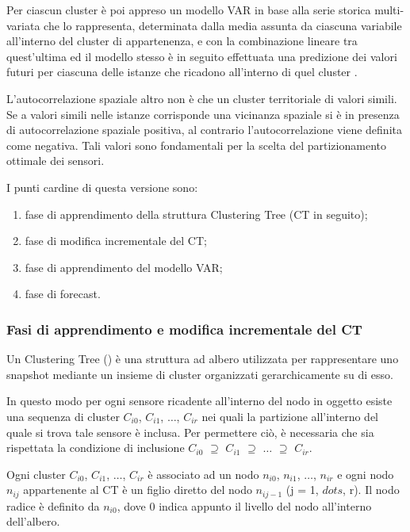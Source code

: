 \documentclass[12pt,a4paper,oneside,openright]{book}
\begin{document}
Per ciascun cluster è poi appreso un modello VAR in base alla serie storica multi-variata che lo rappresenta, determinata dalla media assunta da ciascuna variabile all'interno del cluster di appartenenza, e con la combinazione lineare tra quest'ultima ed il modello stesso è in seguito effettuata una predizione dei valori futuri per ciascuna delle istanze che ricadono all'interno di quel cluster \cite{donato}.

L'autocorrelazione spaziale altro non è che un cluster territoriale di valori simili. Se a valori simili nelle istanze corrisponde una vicinanza spaziale si è in presenza di autocorrelazione spaziale positiva, al contrario l'autocorrelazione viene definita come negativa. Tali valori sono fondamentali per la scelta del partizionamento ottimale dei sensori.

I punti cardine di questa versione sono:
\begin{enumerate}
\item fase di apprendimento della struttura Clustering Tree (CT in seguito);
\item fase di modifica incrementale del CT;
\item fase di apprendimento del modello VAR;
\item fase di forecast.
\end{enumerate}

\subsubsection{Fasi di apprendimento e modifica incrementale del CT}
Un Clustering Tree (\cite{donato}) è una struttura ad albero utilizzata per rappresentare uno snapshot  mediante un insieme di cluster organizzati gerarchicamente su di esso.

In questo modo per ogni sensore ricadente all'interno del nodo in oggetto esiste una sequenza di cluster $C_{i0}$, $C_{i1}$, $\dots$, $C_{ir}$ nei quali la partizione all'interno del quale si trova tale sensore è inclusa. Per permettere ciò, è necessaria che sia rispettata la condizione di inclusione $C_{i0}$ $\supseteq$ $C_{i1}$ $\supseteq$ $\dots$ $\supseteq$ $C_{ir}$. 
\

Ogni cluster $C_{i0}$, $C_{i1}$, $\dots$, $C_{ir}$ è associato ad un nodo $n_{i0}$, $n_{i1}$, $\dots$, $n_{ir}$ e ogni nodo $n_{ij}$ appartenente al CT è un figlio diretto del nodo $n_{ij-1}$ (j = 1, $dots$, r). Il nodo radice è definito da $n_{i0}$, dove 0 indica appunto il livello del nodo all'interno dell'albero.
\end{document}
